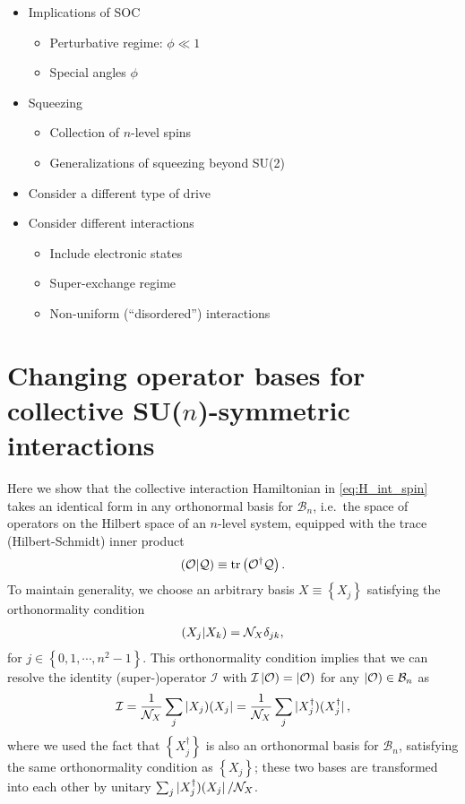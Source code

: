 \documentclass[nofootinbib,notitlepage,11pt]{revtex4-2}
\newcommand{\f}[2]{\dfrac{#1}{#2}} %
\newcommand{\p}[1]{\left(#1\right)} %
\renewcommand{\set}[1]{\left\{#1\right\}} %
\newcommand{\1}{\mathds{1}}
\newcommand{\B}{\mathcal{B}}
\newcommand{\I}{\mathcal{I}}
\newcommand{\N}{\mathcal{N}}
\renewcommand{\O}{\mathcal{O}}
\newcommand{\Q}{\mathcal{Q}}
\def\obra#1{\mathinner{({#1}|}}
\def\oket#1{\mathinner{|{#1})}}
\def\obk#1{\mathinner{({#1})}}
\def\oop#1#2{\oket{#1}\!\obra{#2}}
\begin{document}
\begin{itemize}
\item Implications of SOC
  \begin{itemize}
  \item Perturbative regime: $\phi\ll1$
  \item Special angles $\phi$
  \end{itemize}
\item Squeezing
  \begin{itemize}
  \item Collection of $n$-level spins
  \item Generalizations of squeezing beyond SU(2)
  \end{itemize}
\item Consider a different type of drive
\item Consider different interactions
  \begin{itemize}
  \item Include electronic states
  \item Super-exchange regime
  \item Non-uniform (``disordered'') interactions
  \end{itemize}
\end{itemize}



\appendix

\section{Changing operator bases for collective SU($n$)-symmetric
  interactions}
\label{sec:changing_bases}

Here we show that the collective interaction Hamiltonian in
\eqref{eq:H_int_spin} takes an identical form in any orthonormal basis
for $\B_n$, i.e.~the space of operators on the Hilbert space of an
$n$-level system, equipped with the trace (Hilbert-Schmidt) inner
product
\begin{align}
  \obk{\O|\Q} \equiv \tr\p{\O^\dag \Q}.
\end{align}
To maintain generality, we choose an arbitrary basis
$X\equiv\set{X_j}$ satisfying the orthonormality condition
\begin{align}
  \obk{X_j|X_k} = \N_X \delta_{jk},
\end{align}
for $j\in\set{0,1,\cdots,n^2-1}$.  This orthonormality condition
implies that we can resolve the identity (super-)operator $\I$ with
$\I\oket{\O}=\oket{\O}$ for any $\oket\O\in\B_n$ as
\begin{align}
  \I = \f1{\N_X} \sum_j \oop{X_j}{X_j}
  = \f1{\N_X} \sum_j \oop{X_j^\dag}{X_j^\dag},
\end{align}
where we used the fact that $\set{X_j^\dag}$ is also an orthonormal
basis for $\B_n$, satisfying the same orthonormality condition as
$\set{X_j}$; these two bases are transformed into each other by
unitary $\sum_j\oop{X_j^\dag}{X_j}/\N_X$.
\end{document}
